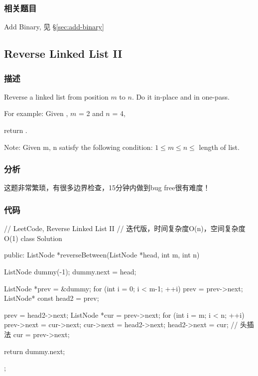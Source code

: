 \subsubsection{相关题目}

\begindot
\item Add Binary, 见 \S \ref{sec:add-binary}
\myenddot


\subsection{Reverse Linked List II}
\label{sec:reverse-linked-list-ii}


\subsubsection{描述}
Reverse a linked list from position $m$ to $n$. Do it in-place and in one-pass.

For example:
Given , $m$ = 2 and $n$ = 4,

return .

Note:
Given m, n satisfy the following condition:
$1 \leq m \leq  n \leq $ length of list.


\subsubsection{分析}
这题非常繁琐，有很多边界检查，15分钟内做到bug free很有难度！


\subsubsection{代码}
\begin{Code}
// LeetCode, Reverse Linked List II
// 迭代版，时间复杂度O(n)，空间复杂度O(1)
class Solution {
public:
    ListNode *reverseBetween(ListNode *head, int m, int n) {
        ListNode dummy(-1);
        dummy.next = head;

        ListNode *prev = &dummy;
        for (int i = 0; i < m-1; ++i)
            prev = prev->next;
        ListNode* const head2 = prev;

        prev = head2->next;
        ListNode *cur = prev->next;
        for (int i = m; i < n; ++i) {
            prev->next = cur->next;
            cur->next = head2->next;
            head2->next = cur;  // 头插法
            cur = prev->next;
        }

        return dummy.next;
    }
};
\end{Code}


